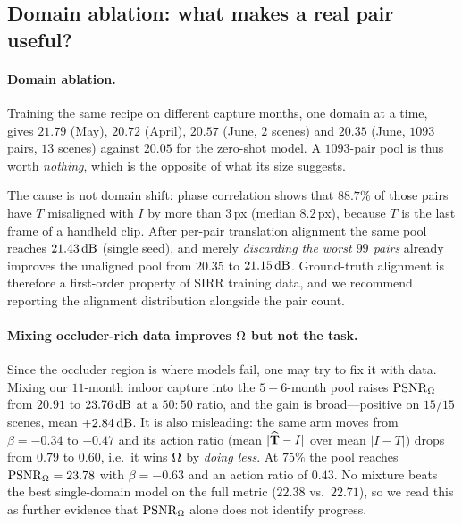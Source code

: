 \subsection{Domain ablation: what makes a real pair useful?}

\paragraph{Domain ablation.}
Training the same recipe on different capture months, one domain at a time, gives
$21.79$ (May), $20.72$ (April), $20.57$ (June, $2$ scenes) and $20.35$ (June, $1093$ pairs,
$13$ scenes) against $20.05$ for the zero-shot model. A $1093$-pair pool is thus worth
\emph{nothing}, which is the opposite of what its size suggests.

The cause is not domain shift:
phase correlation shows that $88.7\%$ of those pairs have $T$ misaligned with $I$ by more than
$3$\,px (median $8.2$\,px), because $T$ is the last frame of a handheld clip. After per-pair
translation alignment the same pool reaches $21.43\,\mathrm{dB}$ (single seed), and merely \emph{discarding
the worst $99$ pairs} already improves the unaligned pool from $20.35$ to $21.15\,\mathrm{dB}$. Ground-truth
alignment is therefore a first-order property of SIRR training data, and we recommend reporting the
alignment distribution alongside the pair count.

\paragraph{Mixing occluder-rich data improves $\Omega$ but not the task.}
Since the occluder region is where models fail, one may try to fix it with data. Mixing
our $11$-month indoor capture into the $5{+}6$-month pool raises $\mathrm{PSNR}_\Omega$ from
$20.91$ to $23.76\,\mathrm{dB}$ at a $50{:}50$ ratio, and the gain is broad---positive on
$15/15$ scenes, mean $+2.84\,\mathrm{dB}$. It is also misleading: the same arm moves from $\beta=-0.34$
to $-0.47$ and its action ratio (mean $|\widehat{\mathbf{T}}-I|$ over mean $|I-T|$) drops from $0.79$ to
$0.60$, i.e.\ it wins $\Omega$ by \emph{doing less}. At $75\%$ the pool reaches
$\mathrm{PSNR}_\Omega=23.78$ with $\beta=-0.63$ and an action ratio of $0.43$. No mixture
beats the best single-domain model on the full metric ($22.38$ vs.\ $22.71$), so we read
this as further evidence that $\mathrm{PSNR}_\Omega$ alone does not identify progress.

